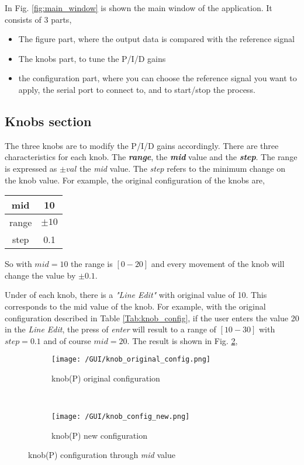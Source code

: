 \newpage
In Fig. \ref{fig:main_window} is shown the main window of the application. It consists of 3 parts,

\begin{itemize}
	\item The figure part, where the output data is compared with the reference signal
	\item The knobs part, to tune the P/I/D gains
	\item the configuration part, where you can choose the reference signal you want to apply, the serial port to connect to, and to start/stop the process.
\end{itemize}


\subsection{Knobs section} \label{sub:knobs}

The three knobs are to modify the P/I/D gains accordingly. There are three characteristics for each knob. The \textit{\textbf{range}}, the \textit{\textbf{mid}} value and the \textit{\textbf{step}}. The range is expressed as $\pm val$ the \textit{mid} value. The \textit{step} refers to the minimum change on the knob value. For example, the original configuration of the knobs are,

\begin{center}
 \label{Tab:knob_config}
\begin{tabular}{|c|c|}
	\hline mid & 10 \\
	\hline range	 & $\pm10$ \\
	\hline step	& 0.1 \\
	\hline		
\end{tabular}
\end{center}

\noindent So with $mid = 10$ the range is $[0-20]$ and every movement of the knob will change the value by $\pm0.1$.

Under of each knob, there is a \textit{"Line Edit"} with original value of 10. This corresponds to the mid value of the knob. For example, with the original configuration described in Table \ref{Tab:knob_config}, if the user enters the value 20 in the \textit{Line Edit}, the press of \textit{enter} will result to a range of $[10-30]$ with $step=0.1$ and of course $mid = 20$. The result is shown in Fig. \ref{fig:knob(P)_new_config},

\begin{figure}[h!]
	\centering
	\begin{subfigure}[t]{0.3\textwidth}
		\centering
		\texttt{[image: /GUI/knob\_original\_config.png]}
		\caption{knob(P) original configuration}
		\label{fig:knob_original_config}
	\end{subfigure}%
	~
	\begin{subfigure}[t]{0.3\textwidth}
		\centering
		\texttt{[image: /GUI/knob\_config\_new.png]}
		\caption{knob(P) new configuration}
		\label{fig:knob(P)_new_config}
	\end{subfigure}
\caption{knob(P) configuration through \textit{mid} value}
\label{fig:knob_config}
\end{figure}


